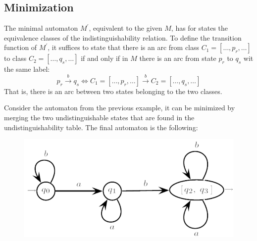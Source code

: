 \subsection*{Minimization}
The minimal automaton $M^{'}$, equivalent to the given $M$, has for states the equivalence classes of the indistinguishability relation. 
To define the transition function of $M^{'}$, it suffices to state that there is an arc from class $C_1=[\dots,p_r,\dots]$ to class $C_2=[\dots,q_s,\dots]$ if and only if in $M$ there is an arc from state $p_r$ to $q_s$ wit the same label: 
\[p_r \overset{b}{\rightarrow}q_s \Leftrightarrow C_1=[\dots,p_r,\dots] \overset{b}{\rightarrow} C_2=[\dots,q_s,\dots]\]
That is, there is an arc between two states belonging to the two classes.
\begin{example}
    Consider the automaton from the previous example, it can be minimized by merging the two undistinguishable states that are found in the undistinguishability table. 
    The final automaton is the following: 
    \begin{figure}[H]
        \centering
        \includegraphics[width=0.5\linewidth]{images/fsamin1.png}
    \end{figure}
\end{example}